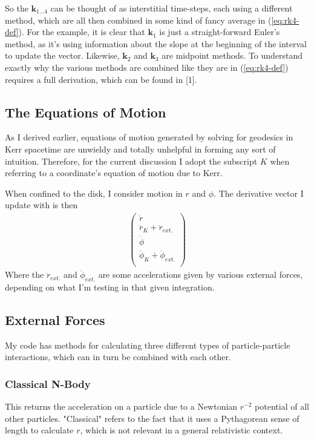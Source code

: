 \documentclass[11pt]{article}
\begin{document}
So the $\mathbf{k}_{1\dots4}$ can be thought of as interstitial time-steps, each using a different method, which are all then combined in some kind of fancy average in (\ref{eq:rk4-def}).  For the example, it is clear that $\mathbf{k}_1$ is just a straight-forward Euler's method, as it's using information about the slope at the beginning of the interval to update the vector.  Likewise, $\mathbf{k}_2$ and $\mathbf{k}_3$ are midpoint methods.  To understand exactly why the various methods are combined like they are in (\ref{eq:rk4-def}) requires a full derivation, which can be found in [1].  


\subsection{The Equations of Motion}
As I derived earlier, equations of motion generated by solving for geodesics in Kerr spacetime are unwieldy and totally unhelpful in forming any sort of intuition.  Therefore, for the current discussion I adopt the subscript $K$ when referring to a coordinate's equation of motion due to Kerr.

When confined to the disk, I consider motion in $r$ and $\phi$.  The derivative vector I update with is then 
\begin{align}
\left(
\begin{array}{c}
\dot{r} \\
\ddot{r}_K+\ddot{r}_{ext.} \\
\dot{\phi} \\
\ddot{\phi}_K+\ddot{\phi}_{ext.} \\
\end{array}
\right)
\end{align}
Where the $\ddot{r}_{ext.}$ and $\ddot{\phi}_{ext.}$ are some accelerations given by various external forces, depending on what I'm testing in that given integration.

\subsection{External Forces}
My code has methods for calculating three different types of particle-particle interactions, which can in turn be combined with each other.
\subsubsection{Classical N-Body}
This returns the acceleration on a particle due to a Newtonian $r^{-2}$ potential of all other particles.  "Classical" refers to the fact that it uses a Pythagorean sense of length to calculate $r$, which is not relevant in a general relativistic context.
\end{document}
